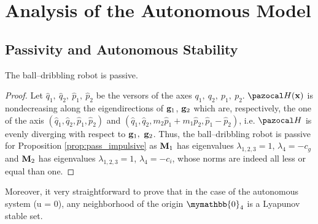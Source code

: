 \section{Analysis of the Autonomous Model}\label{sec:analysis_aut}
\subsection{Passivity and Autonomous Stability}
%
\begin{prop}
    The ball--dribbling robot is passive.
\end{prop}
%
\begin{proof}
    Let $\hat{q}_1,~\hat{q}_2,~\hat{p}_1,~\hat{p}_2$ be the versors of the axes ${q}_1,~{q}_2,~{p}_1,~{p}_2$.
    $\Ha(\xb)$ is nondecreasing along the eigendirections of $\mathbf{g}_1$, $\mathbf{g}_2$ which are, respectively, the one of the axis $(\hat{q}_1,\hat{q}_2,\hat{p}_1,\hat{p}_2)$ and $(\hat{q}_1, \hat{q}_2,m_2\hat{p}_1 + m_1\hat{p}_2,\hat{p}_1-\hat{p}_2)$, i.e. $\Ha$ is evenly diverging with respect to $\mathbf{g}_1,~\mathbf{g}_2$.
    Thus, the ball--dribbling robot is passive for Proposition \ref{prop:pass_impulsive} as
    $\mathbf{M}_1$ has eigenvalues $\lambda_{1,2,3} = 1$, $\lambda_4 = -c_g$ and $\mathbf{M}_2$ has eigenvalues $\lambda_{1,2,3} = 1$, $\lambda_4 = -c_i$, whose norms are indeed all less or equal than one.
\end{proof}
%
Moreover, it very straightforward to prove that in the case of the autonomous system (u = 0), any neighborhood of the origin $\mymathbb{0}_4$ is a Lyapunov stable set.
%
